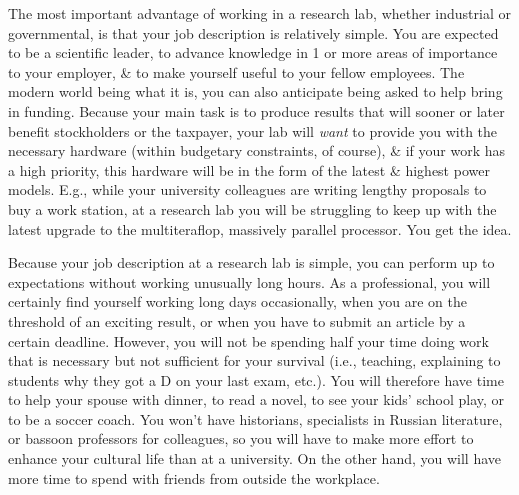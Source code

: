 \documentclass{article}
\begin{document}
\begin{enumerate}
\begin{itemize}
\begin{itemize}
			The most important advantage of working in a research lab, whether industrial or governmental, is that your job description is relatively simple. You are expected to be a scientific leader, to advance knowledge in 1 or more areas of importance to your employer, \& to make yourself useful to your fellow employees. The modern world being what it is, you can also anticipate being asked to help bring in funding. Because your main task is to produce results that will sooner or later benefit stockholders or the taxpayer, your lab will \textit{want} to provide you with the necessary hardware (within budgetary constraints, of course), \& if your work has a high priority, this hardware will be in the form of the latest \& highest power models. E.g., while your university colleagues are writing lengthy proposals to buy a work station, at a research lab you will be struggling to keep up with the latest upgrade to the multiteraflop, massively parallel processor. You get the idea.

			Because your job description at a research lab is simple, you can perform up to expectations without working unusually long hours. As a professional, you will certainly find yourself working long days occasionally, when you are on the threshold of an exciting result, or when you have to submit an article by a certain deadline. However, you will not be spending half your time doing work that is necessary but not sufficient for your survival (i.e., teaching, explaining to students why they got a D on your last exam, etc.). You will therefore have time to help your spouse with dinner, to read a novel, to see your kids' school play, or to be a soccer coach. You won't have historians, specialists in Russian literature, or bassoon professors for colleagues, so you will have to make more effort to enhance your cultural life than at a university. On the other hand, you will have more time to spend with friends from outside the workplace.


\end{itemize}
\end{itemize}
\end{enumerate}
\end{document}
